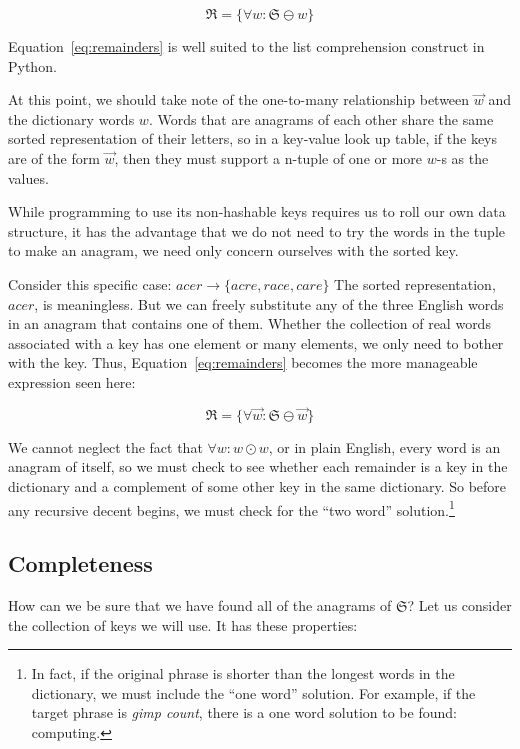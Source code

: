 \documentclass[letterpaper, 11pt]{article}
\newcommand{\w}{$w$\xspace}
\newcommand{\aw}{$\overrightarrow{w}$\xspace}
\begin{document}
\begin{equation}
\label{eq:remainders}
\mathfrak{R} = \{\forall w : \mathfrak{S} \ominus w \}
\end{equation}

Equation~\ref{eq:remainders} is well suited to the list comprehension
construct in Python.

At this point, we should take note of the one-to-many relationship
between \aw and the dictionary words \w. Words that are anagrams
of each other share the same sorted representation of their letters,
so in a key-value look up table, if the keys are of the form \aw,
then they must support a n-tuple of one or more \w-s as the
values.

While programming to use its non-hashable keys requires us to roll
our own data structure, it has the advantage that we do not need
to try the words in the tuple to make an anagram, we need only
concern ourselves with the sorted key.

Consider this specific case: $acer \longrightarrow \{acre, race,
care\}$ The sorted representation, $acer$, is meaningless. But we
can freely substitute any of the three English words in an anagram
that contains one of them. Whether the collection of real words
associated with a key has one element or many elements, we only
need to bother with the key.  Thus, Equation~\ref{eq:remainders}
becomes the more manageable expression seen here:

\begin{equation}
\mathfrak{R} = \{\forall \overrightarrow{w} : \mathfrak{S} \ominus \overrightarrow{w}\}
\end{equation}

We cannot neglect the fact that $\forall w: w \odot w$, or in plain English,
every word is an anagram of itself, so we must check to see whether each
remainder is a key in the dictionary and a complement of some other
key in the same dictionary. So before any recursive decent begins, we 
must check for the ``two word'' solution.\footnote{In fact, if the 
original phrase is shorter than the longest words in the dictionary,
we must include the ``one word'' solution. For example, if the target
phrase is \emph{gimp count}, there is a one word solution to be found: computing.}

\subsection{Completeness}

How can we be sure that we have found all of the anagrams of $\mathfrak{S}$?
Let us consider the collection of keys we will use. It has these properties:
\end{document}
